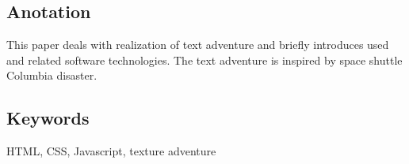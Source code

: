 \documentclass[main.tex]{subfiles}
\begin{document}
\subsection*{Anotation}
This paper deals with realization of text adventure and briefly introduces used and related software technologies. The text adventure is inspired by space shuttle Columbia disaster. 

\subsection*{Keywords}
HTML, CSS, Javascript, texture adventure 
\end{document}
